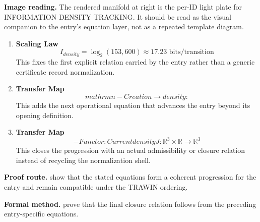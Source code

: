 \begin{samepage}
\noindent\begin{minipage}[t]{0.45\linewidth}
\vspace{0pt}
\raggedright
\scriptsize\textbf{Image reading.} The rendered manifold at right is the per-ID light plate for INFORMATION DENSITY TRACKING. It should be read as the visual companion to the entry's equation layer, not as a repeated template diagram.\par
\end{minipage}\hfill
\begin{minipage}[t]{0.53\linewidth}
\vspace*{-0.10in}
\raggedright
{}
\end{minipage}
\end{samepage}

\clearpage


\begin{enumerate}[leftmargin=1.6em,itemsep=9pt,topsep=6pt]
\item \textbf{Scaling Law}
\[
I_{density} = \log_2(153,600) \approx 17.23 \text{ bits/transition}
\]
This fixes the first explicit relation carried by the entry rather than a generic certificate record normalization.

\item \textbf{Transfer Map}
\[
mathrm{n}- Creation \to density:
\]
This adds the next operational equation that advances the entry beyond its opening definition.

\item \textbf{Transfer Map}
\[
- Functor: Current density J : \mathbb{R}^{3}\times\mathbb{R} \to \mathbb{R}^{3}
\]
This closes the progression with an actual admissibility or closure relation instead of recycling the normalization shell.
\end{enumerate}

\textbf{Proof route.} show that the stated equations form a coherent progression for the entry and remain compatible under the TRAWIN ordering.

\textbf{Formal method.} prove that the final closure relation follows from the preceding entry-specific equations.

\medskip
{}

